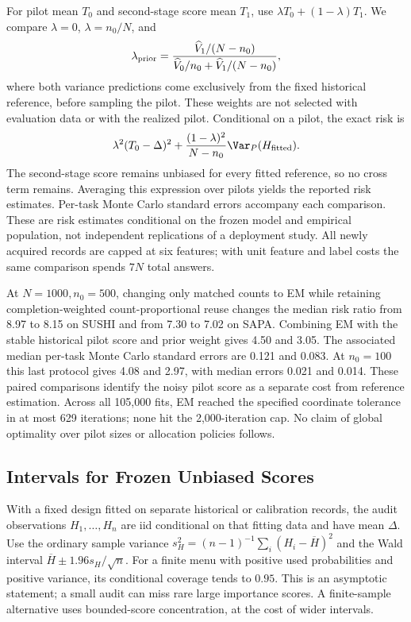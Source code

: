 For pilot mean $T_0$ and second-stage score mean $T_1$, use
$\lambda T_0+(1-\lambda)T_1$. We compare $\lambda=0$, $\lambda=n_0/N$, and
\[
 \lambda_{\rm prior}=
 \frac{\widehat V_1/(N-n_0)}{\widehat V_0/n_0+\widehat V_1/(N-n_0)},
\]
where both variance predictions come exclusively from the fixed historical
reference, before sampling the pilot. These weights are not selected with
evaluation data or with the realized pilot. Conditional on a pilot, the
exact risk is
\[
 \lambda^2(T_0-\Delta)^2+
       \frac{(1-\lambda)^2}{N-n_0}\Var_P(H_{\rm fitted}).
\]
The second-stage score remains unbiased for every fitted reference, so no
cross term remains. Averaging this expression over pilots yields the
reported risk estimates. Per-task Monte Carlo standard errors accompany
each comparison. These are risk estimates conditional on the frozen model
and empirical population, not independent replications of a deployment
study. All newly acquired records are capped at six features; with unit
feature and label costs the same comparison spends $7N$ total answers.



At $N=1000,n_0=500$, changing only matched counts to EM while retaining
completion-weighted count-proportional reuse changes the median risk ratio
from 8.97 to 8.15 on SUSHI and from 7.30 to 7.02 on SAPA. Combining EM
with the stable historical pilot score and prior weight gives 4.50 and
3.05. The associated median per-task Monte Carlo standard errors are
0.121 and 0.083. At $n_0=100$ this last protocol gives 4.08 and 2.97, with
median errors 0.021 and 0.014. These paired comparisons identify the noisy
pilot score as a separate cost from reference estimation. Across all
105,000 fits, EM reached the specified coordinate tolerance in at most
629 iterations; none hit the 2,000-iteration cap. No claim of global
optimality over pilot sizes or allocation policies follows.

\subsection{Intervals for Frozen Unbiased Scores}\label{app:coverage}
With a fixed design fitted on separate historical or calibration records,
the audit observations $H_1,\ldots,H_n$ are iid conditional on that fitting
data and have mean $\Delta$. Use the ordinary sample variance
$s_H^2=(n-1)^{-1}\sum_i(H_i-\overline H)^2$ and the Wald interval
$\overline H\pm1.96s_H/\sqrt n$. For a finite menu with positive used
probabilities and positive variance, its conditional coverage tends to
$0.95$. This is an asymptotic statement; a small audit can miss rare large
importance scores. A finite-sample alternative uses bounded-score
concentration, at the cost of wider intervals.

